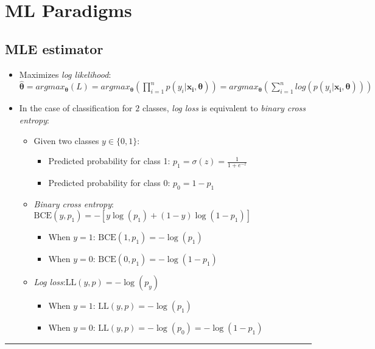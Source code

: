 \section{ML Paradigms}
\subsection*{MLE estimator}
\begin{itemize}
    \item Maximizes \emph{log likelihood}: $\hat{\boldsymbol{\theta}} = argmax_{\boldsymbol{\theta}}(L) = argmax_{\boldsymbol{\theta}}(\prod_{i=1}^n p(y_i |\boldsymbol{x_i}, \boldsymbol{\theta})) = argmax_{\boldsymbol{\theta}}(\sum_{i=1}^n log(p(y_i |\boldsymbol{x_i}, \boldsymbol{\theta})))$
    \item In the case of classification for $2$ classes, \emph{log loss} is equivalent to \emph{binary cross entropy}:
    \begin{itemize}
        \item Given two classes $y \in \{0, 1\}$:
            \begin{itemize}
                \item Predicted probability for class 1: $p_1 = \sigma(z) = \frac{1}{1 + e^{-z}}$
                \item Predicted probability for class 0: $p_0 = 1 - p_1$
            \end{itemize}
        \item \emph{Binary cross entropy}: $\text{BCE}(y, p_1) = -[ y \log(p_1) + (1 - y) \log(1 - p_1) ]$
        \begin{itemize}
            \item When $y = 1$: $\text{BCE}(1, p_1) = -\log(p_1)$
            \item When $y = 0$: $\text{BCE}(0, p_1) = -\log(1 - p_1)$
        \end{itemize}
        \item \emph{Log loss}:$\text{LL}(y, p) = - \log(p_y)$
        \begin{itemize}
            \item When $y = 1$: $\text{LL}(y, p) = -\log(p_1)$
            \item When $y = 0$: $\text{LL}(y, p) = -\log(p_0) = -\log(1 - p_1)$
        \end{itemize}
    \end{itemize}
\end{itemize}

{\color{black}\hrule height 0.001mm}

